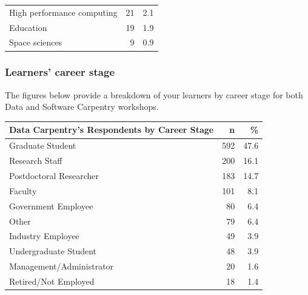\documentclass[]{article}
\begin{document}
\begin{longtable}[]{@{}lrr@{}}
\begin{minipage}[t]{0.81\columnwidth}\raggedright\strut
High performance computing\strut
\end{minipage} & \begin{minipage}[t]{0.05\columnwidth}\raggedleft\strut
21\strut
\end{minipage} & \begin{minipage}[t]{0.05\columnwidth}\raggedleft\strut
2.1\strut
\end{minipage}\tabularnewline
\begin{minipage}[t]{0.81\columnwidth}\raggedright\strut
Education\strut
\end{minipage} & \begin{minipage}[t]{0.05\columnwidth}\raggedleft\strut
19\strut
\end{minipage} & \begin{minipage}[t]{0.05\columnwidth}\raggedleft\strut
1.9\strut
\end{minipage}\tabularnewline
\begin{minipage}[t]{0.81\columnwidth}\raggedright\strut
Space sciences\strut
\end{minipage} & \begin{minipage}[t]{0.05\columnwidth}\raggedleft\strut
9\strut
\end{minipage} & \begin{minipage}[t]{0.05\columnwidth}\raggedleft\strut
0.9\strut
\end{minipage}\tabularnewline
\bottomrule
\end{longtable}

\subsubsection{Learners' career stage}\label{learners-career-stage}

The figures below provide a breakdown of your learners by career stage
for both Data and Software Carpentry workshops.

\begin{longtable}[]{@{}lrr@{}}
\toprule
Data Carpentry's Respondents by Career Stage & n & \%\tabularnewline
\midrule
\endhead
Graduate Student & 592 & 47.6\tabularnewline
Research Staff & 200 & 16.1\tabularnewline
Postdoctoral Researcher & 183 & 14.7\tabularnewline
Faculty & 101 & 8.1\tabularnewline
Government Employee & 80 & 6.4\tabularnewline
Other & 79 & 6.4\tabularnewline
Industry Employee & 49 & 3.9\tabularnewline
Undergraduate Student & 48 & 3.9\tabularnewline
Management/Administrator & 20 & 1.6\tabularnewline
Retired/Not Employed & 18 & 1.4\tabularnewline
\bottomrule
\end{longtable}
\end{document}
